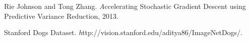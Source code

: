 \documentclass{article}
\begin{document}
\begin{thebibliography}{9}

Rie Johnson and Tong Zhang. 
\textit 
Accelerating Stochastic Gradient Descent using Predictive Variance Reduction, 2013.

Stanford Dogs Dataset. 
\textit 
http://vision.stanford.edu/aditya86/ImageNetDogs/.

\end{thebibliography}
\end{document}
